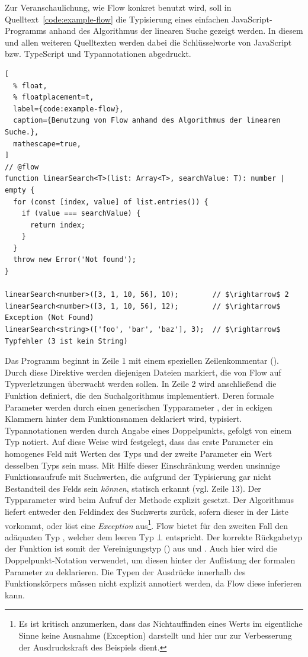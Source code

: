 Zur Veranschaulichung, wie Flow konkret benutzt wird, soll in Quelltext~\ref{code:example-flow} die Typisierung eines einfachen JavaScript-Programms anhand des Algorithmus der linearen Suche gezeigt werden. In diesem und allen weiteren Quelltexten werden dabei die Schlüsselworte von JavaScript bzw. TypeScript  und Typannotationen  abgedruckt.

\begin{lstlisting}[
  % float,
  % floatplacement=t,
  label={code:example-flow},
  caption={Benutzung von Flow anhand des Algorithmus der linearen Suche.},
  mathescape=true,
]
// @flow
function linearSearch<T>(list: Array<T>, searchValue: T): number | empty {
  for (const [index, value] of list.entries()) {
    if (value === searchValue) {
      return index;
    }
  }
  throw new Error('Not found');
}

linearSearch<number>([3, 1, 10, 56], 10);        // $\rightarrow$ 2
linearSearch<number>([3, 1, 10, 56], 12);        // $\rightarrow$ Exception (Not Found)
linearSearch<string>(['foo', 'bar', 'baz'], 3);  // $\rightarrow$ Typfehler (3 ist kein String)
\end{lstlisting}

Das Programm beginnt in Zeile 1 mit einem speziellen Zeilenkommentar (). Durch diese Direktive werden diejenigen Dateien markiert, die von Flow auf Typverletzungen überwacht werden sollen. In Zeile 2 wird anschließend die Funktion  definiert, die den Suchalgorithmus implementiert. Deren formale Parameter werden durch einen generischen Typparameter , der in eckigen Klammern hinter dem Funktionsnamen deklariert wird, typisiert. Typannotationen werden durch Angabe eines Doppelpunkts, gefolgt von einem Typ notiert. Auf diese Weise wird festgelegt, dass das erste Parameter  ein homogenes Feld mit Werten des Typs  und der zweite Parameter  ein Wert desselben Typs sein muss. Mit Hilfe dieser Einschränkung werden unsinnige Funktionsaufrufe mit Suchwerten, die aufgrund der Typisierung gar nicht Bestandteil des Felds sein \emph{können}, statisch erkannt (vgl. Zeile 13). Der Typparameter  wird beim Aufruf der Methode explizit gesetzt.
Der Algorithmus liefert entweder den Feldindex des Suchwerts zurück, sofern dieser in der Liste vorkommt, oder löst eine \textit{Exception} aus\footnote{Es ist kritisch anzumerken, dass das Nichtauffinden eines Werts im eigentliche Sinne keine Ausnahme (Exception) darstellt und hier nur zur Verbesserung der Ausdruckskraft des Beispiels dient.}. Flow bietet für den zweiten Fall den adäquaten Typ , welcher dem leeren Typ $\bot$ entspricht. Der korrekte Rückgabetyp der Funktion ist somit der Vereinigungstyp () aus  und . Auch hier wird die Doppelpunkt-Notation verwendet, um diesen hinter der Auflistung der formalen Parameter zu deklarieren. Die Typen der Ausdrücke innerhalb des Funktionskörpers müssen nicht explizit annotiert werden, da Flow diese inferieren kann.

